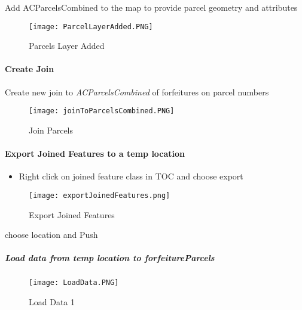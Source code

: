  Add ACParcelsCombined to the map to provide parcel geometry and attributes
 \vspace{.25in}

 \begin{figure}[h!]
 \centering
     \texttt{[image: ParcelLayerAdded.PNG]}
 \caption{Parcels Layer Added}
 \end{figure}
 \clearpage
 \paragraph{Create Join}
 \vspace{.3in}

 Create new join to \emph{ACParcelsCombined} of forfeitures on parcel numbers
 \vspace{.25in}

 \begin{figure}[h!]
 \centering
     \texttt{[image: joinToParcelsCombined.PNG]}
 \caption{Join Parcels}
 \end{figure}
 \clearpage
 \paragraph[Export Joined Features]{Export Joined Features to a temp location \texorpdfstring{\\}{}}
 \begin{itemize}
 \item Right click {{\rtArrow}}  on joined feature class in TOC and choose export
\end{itemize}
 \begin{figure}[h!]
 \centering
     \texttt{[image: exportJoinedFeatures.png]}
 \caption{Export Joined Features}
 \end{figure}
 {\bigbtn choose location and Push }
 \clearpage
 \subparagraph[Load data to forfeitureParcels]{\Large Load data from temp location to forfeitureParcels}
 \subparagraph*{}
 \begin{figure}[h!]
 \centering
     \texttt{[image: LoadData.PNG]}
 \caption{Load Data 1}
 \end{figure}
 \clearpage

